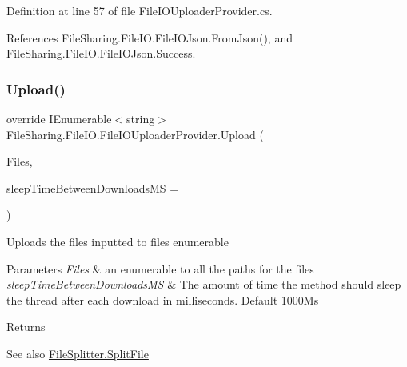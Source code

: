Definition at line 57 of file File\+I\+O\+Uploader\+Provider.\+cs.



References File\+Sharing.\+File\+I\+O.\+File\+I\+O\+Json.\+From\+Json(), and File\+Sharing.\+File\+I\+O.\+File\+I\+O\+Json.\+Success.

\mbox{\label{class_file_sharing_1_1_file_i_o_1_1_file_i_o_uploader_provider_ab60ebd0e31c88f5d365249d59f81e9fd}} 
\subsubsection{\texorpdfstring{Upload()}{Upload()}\hspace{0.1cm}{\footnotesize\ttfamily [2/2]}}
{\footnotesize\ttfamily override I\+Enumerable$<$string$>$ File\+Sharing.\+File\+I\+O.\+File\+I\+O\+Uploader\+Provider.\+Upload (\begin{DoxyParamCaption}\item[{I\+Enumerable$<$ string $>$}]{Files,  }\item[{int}]{sleep\+Time\+Between\+Downloads\+MS = {} }\end{DoxyParamCaption})\hspace{0.3cm}{\ttfamily [virtual]}}



Uploads the files inputted to files enumerable 


\begin{DoxyParams}{Parameters}
{\em Files} & an enumerable to all the paths for the files\\
\hline
{\em sleep\+Time\+Between\+Downloads\+MS} & The amount of time the method should sleep the thread after each download in milliseconds. Default 1000\+Ms\\
\hline
\end{DoxyParams}
\begin{DoxyReturn}{Returns}

\end{DoxyReturn}
\begin{DoxySeeAlso}{See also}
\hyperlink{class_file_sharing_1_1_file_splitter_a25696a2fad3740fa24f79fd194da6ec3}{File\+Splitter.\+Split\+File}


\end{DoxySeeAlso}



